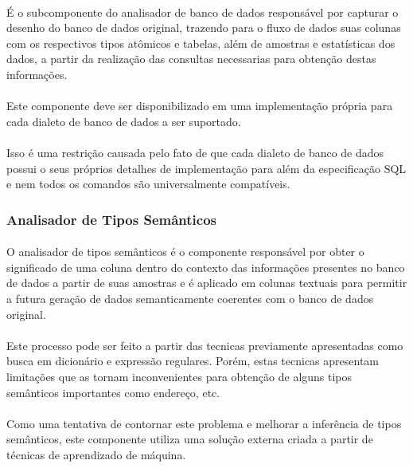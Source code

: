 \paragraph{} É o subcomponente do analisador de banco de dados responsável por capturar o desenho do banco de dados original, trazendo para o fluxo de dados suas colunas com os respectivos tipos atômicos e tabelas, além de amostras e estatísticas dos dados, a partir da realização das consultas necessarias para obtenção destas informações.

\paragraph{} Este componente deve ser disponibilizado em uma implementação própria para cada dialeto de banco de dados a ser suportado.

\paragraph{} Isso é uma restrição causada pelo fato de que cada dialeto de banco de dados possui o seus próprios detalhes de implementação para além da especificação SQL e nem todos os comandos são universalmente compatíveis.

\subsubsection{Analisador de Tipos Semânticos}

\paragraph{} O analisador de tipos semânticos é o componente responsável por obter o significado de uma coluna dentro do contexto das informações presentes no banco de dados a partir de suas amostras e é aplicado em colunas textuais para permitir a futura geração de dados semanticamente coerentes com o banco de dados original.

\paragraph{} Este processo pode ser feito a partir das tecnicas previamente apresentadas como busca em dicionário e expressão regulares. Porém, estas tecnicas apresentam limitações que as tornam inconvenientes para obtenção de alguns tipos semânticos importantes como endereço, etc.

\paragraph{} Como uma tentativa de contornar este problema e melhorar a inferência de tipos semânticos, este componente utiliza uma solução externa criada a partir de técnicas de aprendizado de máquina.

